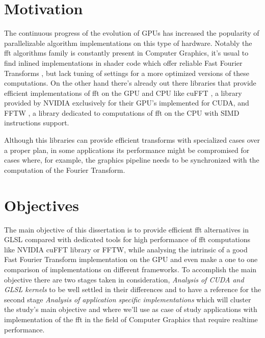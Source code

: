 \documentclass[
  oneside,
  11pt, a4paper,
  footinclude=true,
  headinclude=true,
  cleardoublepage=empty
]{scrbook}
\begin{document}

\section{Motivation} \label{sec:motivation}

The continuous progress of the evolution of GPUs has increased the popularity of parallelizable algorithm implementations on this type of hardware.
Notably the \acrshort{fft} algorithms family is constantly present in Computer Graphics, it's usual to find inlined implementations in shader code which offer reliable Fast Fourier Transforms \cite{flugge2017realtime}, but lack tuning of settings for a more optimized versions of these computations. On the other hand there's already out there libraries that provide efficient implementations of \acrshort{fft} on the GPU and CPU like cuFFT \cite{nvidiacufft}, a library provided by NVIDIA exclusively for their GPU's implemented for CUDA, and FFTW \cite{frigo2012fftw}, a library dedicated to computations of \acrshort{fft} on the CPU with SIMD instructions support.

Although this libraries can provide efficient transforms with specialized cases over a proper plan, in some applications its performance might be compromised for cases where, for example, the graphics pipeline needs to be synchronized with the computation of the Fourier Transform.

\section{Objectives} \label{sec:objectives}

The main objective of this dissertation is to provide efficient \acrshort{fft} alternatives in GLSL compared with dedicated tools for high performance of \acrshort{fft} computations like NVIDIA cuFFT library or FFTW, while analysing the intrinsic of a good Fast Fourier Transform implementation on the GPU and even make a one to one comparison of implementations on different frameworks. %
To accomplish the main objective there are two stages taken in consideration, \textit{Analysis of CUDA and GLSL kernels} to be well settled in their differences and to have a reference for the second stage \textit{Analysis of application specific implementations} which will cluster the study's main objective and where we'll use as case of study applications with implementation of the \acrshort{fft} in the field of Computer Graphics that require realtime performance.
\end{document}
